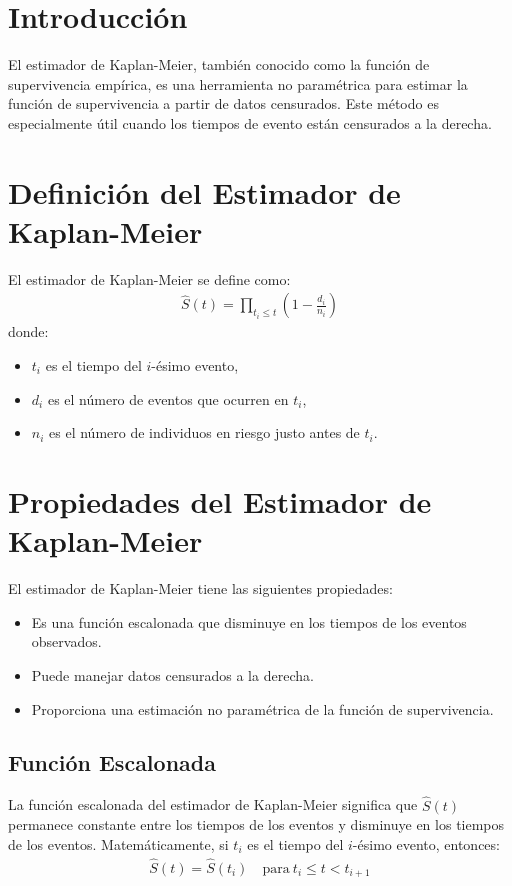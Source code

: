 \documentclass[a4paper]{report} %
\begin{document}
\section{Introducci\'on}
El estimador de Kaplan-Meier, tambi\'en conocido como la funci\'on de supervivencia emp\'irica, es una herramienta no param\'etrica para estimar la funci\'on de supervivencia a partir de datos censurados. Este m\'etodo es especialmente \'util cuando los tiempos de evento est\'an censurados a la derecha.

\section{Definici\'on del Estimador de Kaplan-Meier}
El estimador de Kaplan-Meier se define como:
\begin{eqnarray*}
\hat{S}(t) = \prod_{t_i \leq t} \left(1 - \frac{d_i}{n_i}\right)
\end{eqnarray*}
donde:
\begin{itemize}
    \item $t_i$ es el tiempo del $i$-\'esimo evento,
    \item $d_i$ es el n\'umero de eventos que ocurren en $t_i$,
    \item $n_i$ es el n\'umero de individuos en riesgo justo antes de $t_i$.
\end{itemize}

\section{Propiedades del Estimador de Kaplan-Meier}
El estimador de Kaplan-Meier tiene las siguientes propiedades:
\begin{itemize}
    \item Es una funci\'on escalonada que disminuye en los tiempos de los eventos observados.
    \item Puede manejar datos censurados a la derecha.
    \item Proporciona una estimaci\'on no param\'etrica de la funci\'on de supervivencia.
\end{itemize}

\subsection{Funci\'on Escalonada}
La funci\'on escalonada del estimador de Kaplan-Meier significa que $\hat{S}(t)$ permanece constante entre los tiempos de los eventos y disminuye en los tiempos de los eventos. Matem\'aticamente, si $t_i$ es el tiempo del $i$-\'esimo evento, entonces:
\begin{eqnarray*}
\hat{S}(t) = \hat{S}(t_i) \quad \text{para} \ t_i \leq t < t_{i+1}
\end{eqnarray*}
\end{document}
